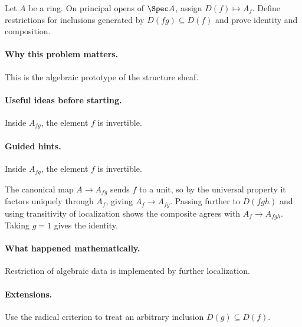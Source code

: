 \begin{problem}
Let $A$ be a ring.  On principal opens of $\Spec A$, assign $D(f)\mapsto A_f$.  Define restrictions for inclusions generated by $D(fg)\subseteq D(f)$ and prove identity and composition.
\end{problem}

\paragraph{Why this problem matters.}
This is the algebraic prototype of the structure sheaf.

\paragraph{Useful ideas before starting.}
Inside $A_{fg}$, the element $f$ is invertible.

\paragraph{Guided hints.}
Inside $A_{fg}$, the element $f$ is invertible.

\begin{solution}
The canonical map $A\to A_{fg}$ sends $f$ to a unit, so by the universal property it factors uniquely through $A_f$, giving $A_f\to A_{fg}$.  Passing further to $D(fgh)$ and using transitivity of localization shows the composite agrees with $A_f\to A_{fgh}$.  Taking $g=1$ gives the identity.
\end{solution}

\paragraph{What happened mathematically.}
Restriction of algebraic data is implemented by further localization.

\paragraph{Extensions.}
Use the radical criterion to treat an arbitrary inclusion $D(g)\subseteq D(f)$.
